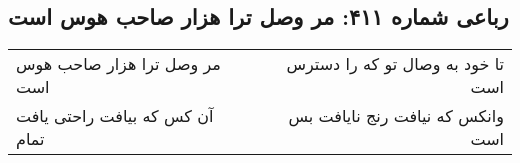 \begin{center}
\section*{رباعی شماره ۴۱۱: مر وصل ترا هزار صاحب هوس است}
\label{sec:0411}
\begin{longtable}{l p{0.5cm} r}
مر وصل ترا هزار صاحب هوس است
&&
تا خود به وصال تو که را دسترس است
\\
آن کس که بیافت راحتی یافت تمام
&&
وانکس که نیافت رنج نایافت بس است
\\
\end{longtable}
\end{center}
